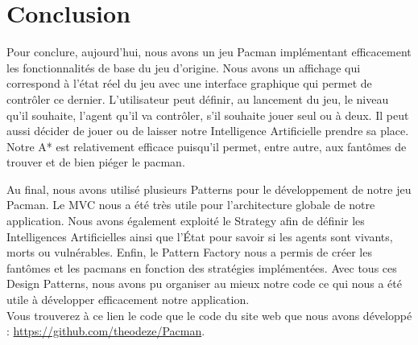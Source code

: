 \documentclass[a4paper, 11pt]{article}
\begin{document}
\part*{Conclusion}

Pour conclure, aujourd'hui, nous avons un jeu Pacman implémentant efficacement les fonctionnalités de base du jeu d'origine. Nous avons un affichage qui correspond
à l'état réel du jeu avec une interface graphique qui permet de contrôler ce dernier. L'utilisateur peut définir, au lancement du jeu, le niveau qu'il souhaite, 
l'agent qu'il va contrôler, s'il souhaite jouer seul ou à deux. Il peut aussi décider de jouer ou de laisser notre Intelligence Artificielle prendre sa place.
Notre A* est relativement efficace puisqu'il permet, entre autre, aux fantômes de trouver et de bien piéger le pacman.

Au final, nous avons utilisé plusieurs Patterns pour le développement de notre jeu Pacman. Le MVC nous a été très utile pour l'architecture globale
de notre application. Nous avons également exploité le Strategy afin de définir les Intelligences Artificielles ainsi que l'État pour savoir si les agents 
sont vivants, morts ou vulnérables. Enfin, le Pattern Factory nous a permis de créer les fantômes et les pacmans en fonction des stratégies implémentées. 
Avec tous ces Design Patterns, nous avons pu organiser au mieux notre code ce qui nous a été utile à développer efficacement notre application. \\

Vous trouverez à ce lien le code que le code du site web que nous avons développé : \url{https://github.com/theodeze/Pacman}.
\end{document}
